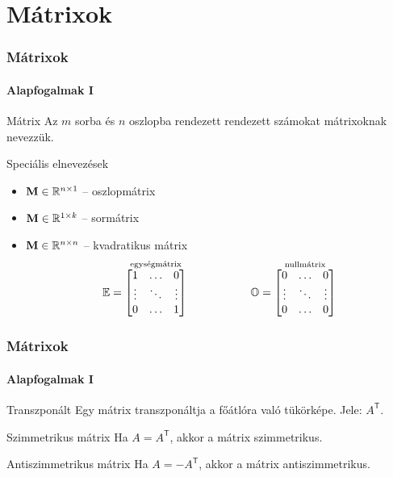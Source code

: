 \section{Mátrixok}
\begin{frame}
  \frametitle{Mátrixok}
  \framesubtitle{Alapfogalmak I}

  \vfill

  \begin{block}{Mátrix}
    Az $m$ sorba és $n$ oszlopba rendezett rendezett számokat mátrixoknak
    nevezzük.
  \end{block}

  \vfill

  \begin{block}{Speciális elnevezések}
    \begin{itemize}
      \item $\mathbf{M} \in \mathbb R^{n \times 1}$ -- oszlopmátrix
      \item $\mathbf{M} \in \mathbb R^{1 \times k}$ -- sormátrix
      \item $\mathbf{M} \in \mathbb R^{n \times n}$ -- kvadratikus mátrix
            \[
              {\mathbb{E}} = \overset{\text{egységmátrix}}{\begin{bmatrix}
                  1      & \dots  & 0      \\
                  \vdots & \ddots & \vdots \\
                  0      & \dots  & 1
                \end{bmatrix}}
              \hspace{2cm}
              {\mathbb{O}} = \overset{\text{nullmátrix}}{\begin{bmatrix}
                  0      & \dots  & 0      \\
                  \vdots & \ddots & \vdots \\
                  0      & \dots  & 0
                \end{bmatrix}}
            \]
    \end{itemize}
  \end{block}

  \vfill
\end{frame}

\begin{frame}
  \frametitle{Mátrixok}
  \framesubtitle{Alapfogalmak I}

  \vfill

  \begin{block}{Transzponált}
    Egy mátrix transzponáltja a főátlóra való tükörképe. Jele: $A^\mathsf T$.
  \end{block}

  \vfill

  \begin{block}{Szimmetrikus mátrix}
    Ha $A = A^\mathsf T$, akkor a mátrix szimmetrikus.
  \end{block}

  \vfill

  \begin{block}{Antiszimmetrikus mátrix}
    Ha $A = -A^\mathsf T$, akkor a mátrix antiszimmetrikus.
  \end{block}

  \vfill
\end{frame}

